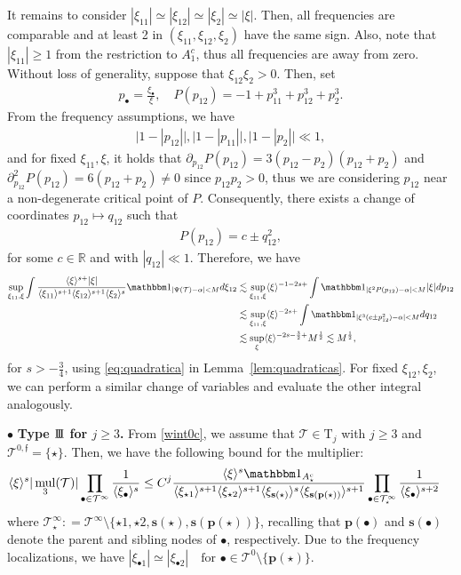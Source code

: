 \documentclass[a4paper,
11pt,  reqno]{amsart}
\newcommand{\III}{\textup{I \hspace{-2.9mm} I \hspace{-2.9mm} I}}
\newcommand{\5}{\textup{V}}
\newcommand{\noi}{\noindent}
\newcommand{\ind}{\mathbbm 1}
\newcommand{\les}{\lesssim}
\theoremstyle{remark}
\newcommand{\R}{\mathbb{R}}
\newcommand{\bul}{\bullet}
\newcommand{\TT}{\mathcal{T}}
\newcommand{\Tr}{\mathrm{T}}
\newcommand{\al}{\alpha}
\newcommand{\pb}{\mathbf{p}}
\newcommand{\sbf}{\mathbf{s}}
\newcommand{\jb}[1]
{\langle #1 \rangle}
\newcommand{\ff}{\mathfrak{f}}
\DeclareMathOperator{\mul}{mul}
\numberwithin{equation}{section}
\numberwithin{theorem}{section}
\begin{document}
It remains to consider $|\xi_{11}| \simeq |\xi_{12}| \simeq |\xi_2| \simeq |\xi|$. Then, all frequencies are comparable and at least 2 in $(\xi_{11}, \xi_{12}, \xi_2)$ have the same sign.
Also, note that $|\xi_{11}| \ge 1$ from the restriction to $A_1^c$, thus all frequencies are away from zero. 
Without loss of generality, suppose that $\xi_{12} \xi_2 >0$. Then, set
\begin{align}
    p_\bul = \frac{\xi_\bul}{\xi}, \quad P(p_{12}) = - 1 + p_{11}^3 + p_{12}^3 + p_2^3. 
\end{align}
From the frequency assumptions, we have
\begin{align} 
    \big| 1 - |p_{12}| \big| , 
    \big| 1 - |p_{11}| \big| , 
    \big| 1 - |p_{2}| \big| \ll 1, 
\end{align}
and for fixed $\xi_{11}, \xi$, it holds that $\partial_{p_{12}} P(p_{12}) = 3 (p_{12} - p_2) (p_{12} + p_2) $ and $\partial^2_{p_{12}}P(p_{12}) = 6 (p_{12} + p_2) \ne 0$ since $p_{12}p_2 >0$, thus we are considering $p_{12}$ near a non-degenerate critical point of $P$. Consequently, there exists a change of coordinates $p_{12} \mapsto q_{12}$ such that
\begin{align}
    P(p_{12}) = c \pm q_{12}^2, 
\end{align}
for some $c\in\R$ 
and with $|q_{12}| \ll 1$. Therefore, we have
\begin{align}
\sup_{\xi_{11}, \xi} \int 
\frac{\jb{\xi}^{s+} |\xi|  }{ \jb{\xi_{11}}^{s+1} \jb{\xi_{12}}^{s+1} \jb{\xi_{2}}^s}
    \ind_{|\Psi(\TT)- \al | < M } d\xi_{12}
    &
    \les \sup_{\xi_{11}, \xi} 
    \jb{\xi}^{-1-2s+} 
    \int \ind_{|\xi^2P(p_{12}) - \al | < M } |\xi| d p_{12} 
    \\
    &
    \les \sup_{\xi_{11}, \xi} 
    \jb{\xi}^{-2s+}
    \int \ind_{|\xi^3(c \pm p_{12}^2) - \al| < M} dq_{12}
    \\
    &
    \les \sup_\xi \jb{\xi}^{-2s - \frac32 + } M^\frac12 \les M^\frac12, 
\end{align}
for $s>-\frac34$, using \eqref{eq:quadratica} in  Lemma~\ref{lem:quadraticas}. For fixed $\xi_{12}, \xi_2$, we can perform a similar change of variables and evaluate the other integral analogously. 


\smallskip
\noi
$\bul$ \textbf{Type $\III$ for $j\ge 3$.}
From \eqref{wint0c}, we assume that $\TT \in \Tr_j$ with $j\ge3$ and $\TT^{0,\ff} = \{\star\}$. Then,  we have the following bound for the multiplier:
\begin{align}
    \jb{\xi}^s | \mul_3 (\TT)| 
    \prod_{\bul \in \TT^\infty} \frac{1}{\jb{\xi_\bul}^s}
    &
    \le C^j 
    \frac{\jb{\xi}^{s} \ind_{A_\star^c} }{ \jb{\xi_{\star1}}^{s+1} \jb{\xi_{\star2}}^{s+1} \jb{\xi_{\sbf(\star)}}^s \jb{\xi_{\sbf(\pb(\star))}}^{s+1}} \prod_{\bul \in \TT^\infty_\star} \frac{1}{\jb{\xi_\bul}^{s+2}}
\end{align}
where $\TT^\infty_\star : = \TT^\infty \setminus \{\star1, \star2, \sbf(\star), \sbf(\pb(\star))\}$, recalling that $\pb(\bul)$ and $\sbf(\bul)$ denote the parent and sibling nodes of $\bul$, respectively.
Due to the frequency localizations, we have
$
    |\xi_{\bul1}| \simeq |\xi_{\bul2}| \quad \text{for } \bul \in \TT^0\setminus\{\pb(\star)\} 
$.
\end{document}
